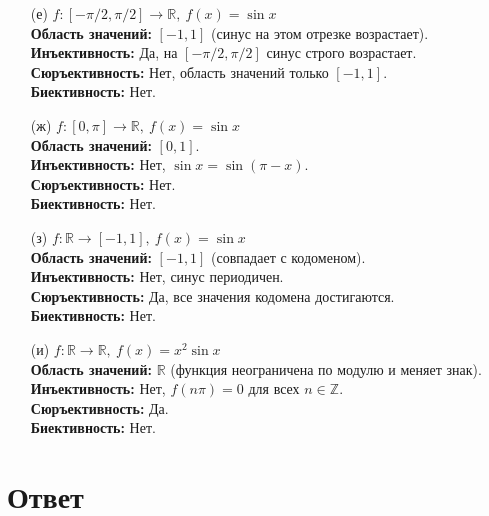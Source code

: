 \documentclass[12pt]{article}
\begin{document}
\begin{enumerate}
    \item[(е)] $f : [-\pi/2, \pi/2] \to \mathbb{R},\ f(x) = \sin x$ \\
    \textbf{Область значений:} $[-1, 1]$ (синус на этом отрезке возрастает). \\
    \textbf{Инъективность:} Да, на $[-\pi/2, \pi/2]$ синус строго возрастает. \\
    \textbf{Сюръективность:} Нет, область значений только $[-1,1]$. \\
    \textbf{Биективность:} Нет.

    \item[(ж)] $f : [0, \pi] \to \mathbb{R},\ f(x) = \sin x$ \\
    \textbf{Область значений:} $[0, 1]$. \\
    \textbf{Инъективность:} Нет, $\sin x = \sin(\pi - x)$. \\
    \textbf{Сюръективность:} Нет. \\
    \textbf{Биективность:} Нет.

    \item[(з)] $f : \mathbb{R} \to [-1, 1],\ f(x) = \sin x$ \\
    \textbf{Область значений:} $[-1, 1]$ (совпадает с кодоменом). \\
    \textbf{Инъективность:} Нет, синус периодичен. \\
    \textbf{Сюръективность:} Да, все значения кодомена достигаются. \\
    \textbf{Биективность:} Нет.

    \item[(и)] $f : \mathbb{R} \to \mathbb{R},\ f(x) = x^2 \sin x$ \\
    \textbf{Область значений:} $\mathbb{R}$ (функция неограничена по модулю и меняет знак). \\
    \textbf{Инъективность:} Нет, $f(n\pi) = 0$ для всех $n \in \mathbb{Z}$. \\
    \textbf{Сюръективность:} Да. \\
    \textbf{Биективность:} Нет.
\end{enumerate}

\section*{Ответ}
\end{document}
